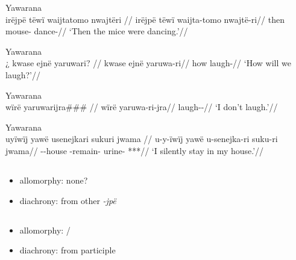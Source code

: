 \documentclass{memoir}
\begin{document}
\ex Yawarana \\
\label{ctorat-16}    \begingl
    \glpreamble  irëjpë tëwï waijtatomo nwajtëri //
    \gla irëjpë tëwï waijta-tomo nwajtë-ri//
    \glb then  mouse- dance-//
        \glft ‘Then the mice were dancing.’//  
    \endgl 
\xe

\ex Yawarana \\
\label{convrisamaj-06}    \begingl
    \glpreamble ¿ kwase ejnë yaruwari? //
    \gla kwase ejnë yaruwa-ri//
    \glb how  laugh-//
        \glft ‘How will we laugh?’//  
    \endgl 
\xe

\ex Yawarana \\
\label{convrisamaj-04}    \begingl
    \glpreamble  wïrë yaruwarijra\#\#\# //
    \gla wïrë yaruwa-ri-jra//
    \glb {} laugh--//
        \glft ‘I don’t laugh.’//  
    \endgl 
\xe

\ex Yawarana \\
\label{convrisamaj-28}    \begingl
    \glpreamble  uyïwïj yawë usenejkari sukuri jwama //
    \gla u-y-ïwïj yawë u-senejka-ri suku-ri jwama//
    \glb {}--house  -remain- urine- ***//
        \glft ‘I silently stay in my house.’//  
    \endgl 
\xe

\subsection{\texorpdfstring{}{}}

\begin{itemize}
\tightlist
\item
  allomorphy: none?
\item
  diachrony: from other \emph{-jpë}
\end{itemize}

\subsection{\texorpdfstring{}{}}

\begin{itemize}
\tightlist
\item
  allomorphy: /
\item
  diachrony: from participle
\end{itemize}

\subsection{\texorpdfstring{}{}}
\end{document}
